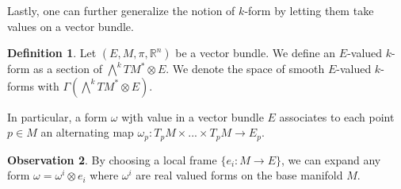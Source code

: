 \documentclass[12pt,a4paper]{report}
\theoremstyle{definition}
\newtheorem{Def}{Definition}[chapter]
\theoremstyle{Theorem}
\theoremstyle{definition}
\theoremstyle{definition}
\newtheorem{Obs}[Def]{Observation}
\begin{document}
	Lastly, one can further generalize the notion of $k$-form by letting them take values on a vector bundle.
	\begin{Def}
		Let $(E,M,\pi, \mathbb{R}^n)$ be a vector bundle. We define an $E$-valued $k$-form as a section of $\bigwedge^kTM^*\otimes E$. We denote the space of smooth $E$-valued $k$-forms with $\Gamma(\bigwedge^kTM^*\otimes E)$.
	\end{Def}
	In particular, a form $\omega$ wjth value in a vector bundle $E$ associates to each point $p\in M$ an alternating map $\omega_p:T_pM\times...\times T_pM\rightarrow E_p$.
	\begin{Obs}
		By choosing a local frame $\{e_i:M\rightarrow E\}$, we can expand any form $\omega=\omega^i\otimes e_i$ where $\omega^i$ are real valued forms on the base manifold $M$.
	\end{Obs}
\end{document}
